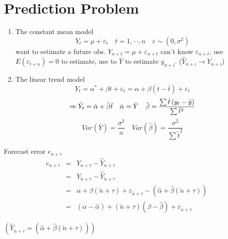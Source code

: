 \documentclass{article}
\begin{document}
\setcounter{part}{5}

\part{Prediction Problem}

\begin{enumerate}
\item The constant mean model%
\begin{equation*}
Y_{t}=\mu +\varepsilon _{t}\quad t=1,\cdots ,n\quad \varepsilon \sim \left(
0,\sigma ^{2}\right)
\end{equation*}%
want to estimate a future obs. $Y_{n+t}=\mu +\varepsilon _{n+t}$ can't know $%
\varepsilon _{n+t}$, use $E\left( \varepsilon _{t+n}\right) =0$ to estimate,
use to $\bar{Y}$ to estimate $y_{n+i}$. ($\hat{Y}_{n+i}\rightarrow Y_{n+i}$)

\item The linear trend model%
\begin{equation*}
Y_{t}=\alpha ^{\ast }+\beta t+\varepsilon _{t}=\alpha +\beta \left( t-\bar{t}%
\right) +\varepsilon _{t}
\end{equation*}%
\begin{equation*}
\Rightarrow \hat{Y}_{t}=\hat{\alpha}+\hat{\beta}\tilde{t}\quad \hat{\alpha}=%
\bar{Y}\quad \hat{\beta}=\frac{\sum \tilde{t}\left( y_{t}-\bar{y}\right) }{%
\sum \tilde{t}^{2}}
\end{equation*}%
\begin{equation*}
Var\left( \bar{Y}\right) =\frac{\sigma ^{2}}{n}\quad Var\left( \hat{\beta}%
\right) =\frac{\sigma ^{2}}{\sum \tilde{t}^{2}}
\end{equation*}
\end{enumerate}

\bigskip

Forecast error $e_{n+\tau }$%
\begin{eqnarray*}
e_{n+\tau } &=&Y_{n+\tau }-\hat{Y}_{n+\tau } \\
&=&Y_{\tilde{n}+\tau }-\hat{Y}_{\tilde{n}+\tau } \\
&=&\alpha +\beta \left( \tilde{n}+\tau \right) +\varepsilon _{\tilde{n}+\tau
}-\left( \hat{\alpha}+\hat{\beta}\left( \tilde{n}+\tau \right) \right) \\
&=&\left( \alpha -\hat{\alpha}\right) +\left( \tilde{n}+\tau \right) \left(
\beta -\hat{\beta}\right) +\varepsilon _{\tilde{n}+\tau }
\end{eqnarray*}

$\left( \hat{Y}_{\tilde{n}+\tau }=\left( \hat{\alpha}+\hat{\beta}\left( 
\tilde{n}+\tau \right) \right) \right) $
\end{document}
